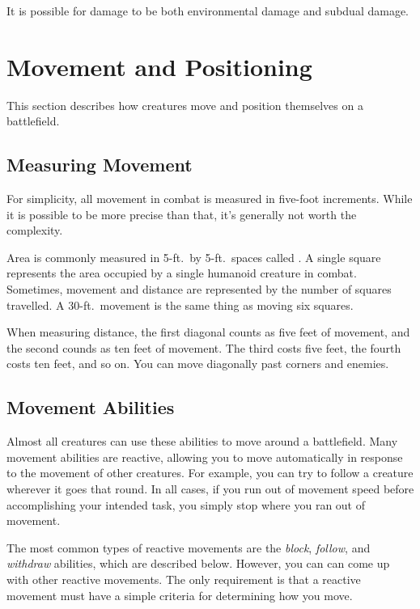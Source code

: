             It is possible for damage to be both environmental damage and subdual damage.

\section{Movement and Positioning}\label{Movement and Positioning}

    This section describes how creatures move and position themselves on a battlefield.

    \subsection{Measuring Movement}

        For simplicity, all movement in combat is measured in five-foot increments.
        While it is possible to be more precise than that, it's generally not worth the complexity.

        \label{Squares} Area is commonly measured in 5-ft.\ by 5-ft.\ spaces called .
        A single square represents the area occupied by a single humanoid creature in combat.
        Sometimes, movement and distance are represented by the number of squares travelled.
        A 30-ft.\ movement is the same thing as moving six squares.

        \label{Diagonals} When measuring distance, the first diagonal counts as five feet of movement, and the second counds as ten feet of movement.
        The third costs five feet, the fourth costs ten feet, and so on.
        You can move diagonally past corners and enemies.

    \subsection{Movement Abilities}\label{Movement Abilities}

        Almost all creatures can use these abilities to move around a battlefield.
        Many movement abilities are reactive, allowing you to move automatically in response to the movement of other creatures.
        For example, you can try to follow a creature wherever it goes that round.
        In all cases, if you run out of movement speed before accomplishing your intended task, you simply stop where you ran out of movement.

        The most common types of reactive movements are the \textit{block}, \textit{follow}, and \textit{withdraw} abilities, which are described below.
        However, you can can come up with other reactive movements.
        The only requirement is that a reactive movement must have a simple criteria for determining how you move.

